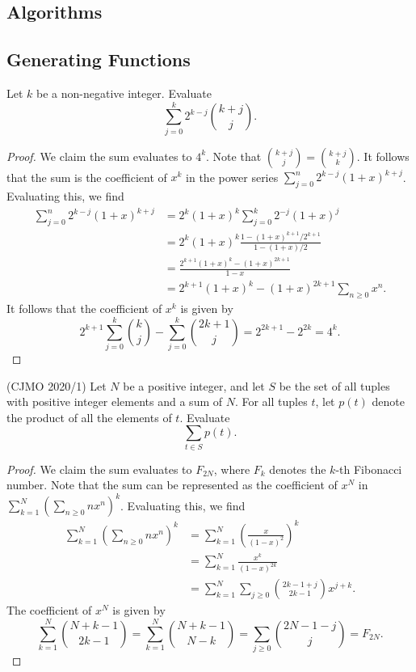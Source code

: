 \documentclass[11pt]{article}
\renewcommand{\>}{\rangle}
\newcommand{\<}{\langle}
\begin{document}
\begin{problem}


\end{problem}
\subsection{Algorithms}

\subsection{Generating Functions}
\begin{problem}[Putnam 2020 A2] Let $k$ be a non-negative integer.  Evaluate 
$$\sum_{j=0}^k 2^{k-j} \binom{k+j}{j}.$$
\begin{proof}
We claim the sum evaluates to $4^k$.  Note that $\binom{k+j}{j} = \binom{k+j}{k}$.  It follows that the sum is the coefficient of $x^k$ in the power series $\sum_{j=0}^n 2^{k-j} (1 + x)^{k + j}$.  Evaluating this, we find
\begin{align*}
\sum_{j=0}^n 2^{k-j} (1 + x)^{k + j} &= 2^{k}(1 + x)^{k} \sum_{j=0}^k 2^{-j} (1 + x)^j \\
&= 2^k (1 + x)^k \frac{1 - (1 + x)^{k+1}/2^{k+ 1}}{1 - (1 + x)/2} \\
&= \frac{2^{k + 1}(1 + x)^k - (1 + x)^{2k + 1}}{1 - x} \\
&= 2^{k + 1}(1 + x)^k - (1 + x)^{2k + 1} \sum_{n \ge 0} x^n.
\end{align*}
It follows that the coefficient of $x^k$ is given by 
$$2^{k +1} \sum_{j=0}^k \binom{k}{j} - \sum_{j=0}^k \binom{2k+1}{j} = 2^{2k+1} - 2^{2k} = 4^k.$$
\end{proof}
\end{problem} 
\begin{problem}(CJMO 2020/1) Let $N$ be a positive integer, and let $S$ be the set of all tuples with positive integer elements and a sum of $N$.  For all tuples $t$, let $p(t)$ denote the product of all the elements of $t$.  Evaluate 
$$\sum_{t \in S} p(t).$$
\end{problem}
\begin{proof}
We claim the sum evaluates to $F_{2N}$, where $F_k$ denotes the $k$-th Fibonacci number.  Note that the sum can be represented as the coefficient of $x^N$ in $\sum_{k=1}^N \left (\sum_{n \ge 0} nx^n \right)^k$.  Evaluating this, we find 
\begin{align*}
\sum_{k=1}^N \left (\sum_{n \ge 0} nx^n \right)^k &=  \sum_{k=1}^N \left ( \frac{x}{(1 - x)^2} \right)^k \\
&= \sum_{k=1}^N \frac{x^k}{(1 - x)^{2k}} \\
&= \sum_{k=1}^N \sum_{j \ge 0} \binom{2k - 1 + j}{2k - 1} x^{j + k} .
\end{align*}
The coefficient of $x^N$ is given by  $$\sum_{k=1}^N \binom{N + k - 1}{2k - 1} = \sum_{k=1}^N \binom{N + k - 1}{N - k} = \sum_{j \ge 0} \binom{2N - 1 - j}{j} = F_{2N}.$$
\end{proof}
\end{document}
